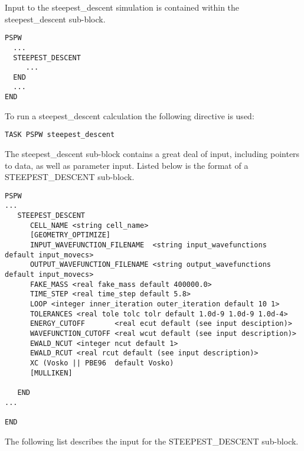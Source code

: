Input to the steepest\_descent simulation is contained
within the steepest\_descent sub-block.
\begin{verbatim}
PSPW
  ...
  STEEPEST_DESCENT
     ...
  END
  ...
END
\end{verbatim}
To run a steepest\_descent calculation the following directive is used:
\begin{verbatim}
TASK PSPW steepest_descent 
\end{verbatim}
The steepest\_descent sub-block contains a great deal
of input, including pointers to data, as well as
parameter input.  Listed below is the format of a STEEPEST\_DESCENT sub-block.
\begin{verbatim}
PSPW
...
   STEEPEST_DESCENT
      CELL_NAME <string cell_name>
      [GEOMETRY_OPTIMIZE]
      INPUT_WAVEFUNCTION_FILENAME  <string input_wavefunctions  default input_movecs>
      OUTPUT_WAVEFUNCTION_FILENAME <string output_wavefunctions default input_movecs>
      FAKE_MASS <real fake_mass default 400000.0>
      TIME_STEP <real time_step default 5.8>
      LOOP <integer inner_iteration outer_iteration default 10 1>
      TOLERANCES <real tole tolc tolr default 1.0d-9 1.0d-9 1.0d-4>
      ENERGY_CUTOFF       <real ecut default (see input desciption)>
      WAVEFUNCTION_CUTOFF <real wcut default (see input description)>
      EWALD_NCUT <integer ncut default 1>
      EWALD_RCUT <real rcut default (see input description)>
      XC (Vosko || PBE96  default Vosko)
      [MULLIKEN]

   END
...

END
\end{verbatim}
The following list describes the input for the STEEPEST\_DESCENT
sub-block.
